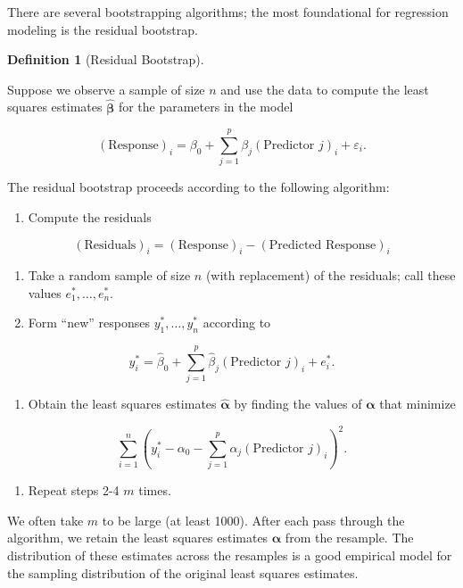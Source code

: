 \documentclass[
  letterpaper,
  DIV=11,
  numbers=noendperiod]{scrreprt}
\providecommand{\tightlist}{%
  \setlength{\itemsep}{0pt}\setlength{\parskip}{0pt}}\usepackage{longtable,booktabs,array}
\theoremstyle{definition}
\newtheorem{definition}{Definition}[chapter]
\theoremstyle{definition}
\theoremstyle{remark}
\begin{document}
There are several bootstrapping algorithms; the most foundational for
regression modeling is the residual bootstrap.

\begin{definition}[Residual
Bootstrap]\protect\hypertarget{def-residual-bootstrap}{}\label{def-residual-bootstrap}

Suppose we observe a sample of size \(n\) and use the data to compute
the least squares estimates \(\widehat{\boldsymbol{\beta}}\) for the
parameters in the model

\[(\text{Response})_i = \beta_0 + \sum_{j=1}^{p} \beta_j (\text{Predictor } j)_i + \varepsilon_i.\]

The residual bootstrap proceeds according to the following algorithm:

\begin{enumerate}
\def\labelenumi{\arabic{enumi}.}
\tightlist
\item
  Compute the residuals
\end{enumerate}

\[(\text{Residuals})_i = (\text{Response})_i - (\text{Predicted Response})_i\]

\begin{enumerate}
\def\labelenumi{\arabic{enumi}.}
\setcounter{enumi}{1}
\tightlist
\item
  Take a random sample of size \(n\) (with replacement) of the
  residuals; call these values \(e_1^*, \dotsc, e_n^*\).
\item
  Form ``new'' responses \(y_1^*, \dotsc, y_n^*\) according to
\end{enumerate}

\[y_i^* = \widehat{\beta}_0 + \sum_{j=1}^{p} \widehat{\beta}_j (\text{Predictor } j)_i + e_i^*.\]

\begin{enumerate}
\def\labelenumi{\arabic{enumi}.}
\setcounter{enumi}{3}
\tightlist
\item
  Obtain the least squares estimates \(\widehat{\boldsymbol{\alpha}}\)
  by finding the values of \(\boldsymbol{\alpha}\) that minimize
\end{enumerate}

\[\sum_{i=1}^{n} \left(y_i^* - \alpha_0 - \sum_{j=1}^{p} \alpha_j (\text{Predictor } j)_i\right)^2.\]

\begin{enumerate}
\def\labelenumi{\arabic{enumi}.}
\setcounter{enumi}{4}
\tightlist
\item
  Repeat steps 2-4 \(m\) times.
\end{enumerate}

We often take \(m\) to be large (at least 1000). After each pass through
the algorithm, we retain the least squares estimates
\(\widehat{\boldsymbol{\alpha}}\) from the resample. The distribution of
these estimates across the resamples is a good empirical model for the
sampling distribution of the original least squares estimates.

\end{definition}
\end{document}
